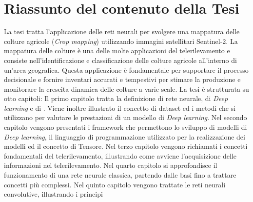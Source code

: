 \section*{Riassunto del contenuto della Tesi}
La tesi tratta l'applicazione delle reti neurali %
per svolgere  
una mappatura delle colture agricole (\textit{Crop mapping}) 
utilizzando immagini satellitari Sentinel-2.
La mappatura delle colture è una delle molte applicazioni del telerilevamento e 
consiste nell’identificazione e classificazione delle colture agricole 
all'interno di un'area geografica.
Questa applicazione è fondamentale per supportare il 
processo decisionale e fornire inventari accurati e tempestivi per stimare la 
produzione e monitorare la crescita dinamica delle colture a varie scale. 
La tesi è strutturata su otto capitoli:
Il primo capitolo tratta la definizione di rete neurale, di \textit{Deep learning} e di 
.
Viene inoltre illustrato il concetto di dataset ed i metodi che si utilizzano per 
valutare le prestazioni di un modello di \textit{Deep learning}.
Nel secondo capitolo vengono presentati i framework che permettono lo sviluppo di modelli 
di \textit{Deep learning}, il linguaggio di programmazione utilizzato per la realizzazione dei 
modelli ed il concetto di Tensore.
Nel terzo capitolo vengono richiamati i concetti fondamentali del
telerilevamento, illustrando come avviene l'acquisizione delle informazioni nel telerilevamento.
Nel quarto capitolo si approfondisce il funzionamento di una rete neurale classica, 
partendo dalle basi fino a trattare concetti più complessi.
Nel quinto capitolo vengono trattate le reti neurali convolutive, illustrando i principi 
